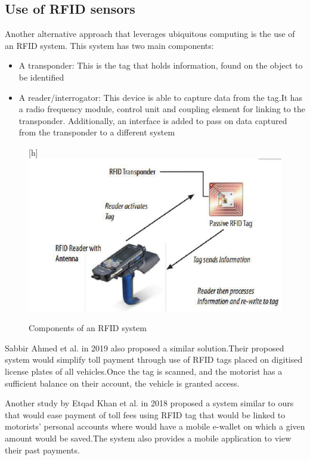 \subsection{Use of RFID sensors}
Another alternative approach that leverages ubiquitous computing is the use of an RFID system. This system has two main components:
\begin{itemize}
    \item A transponder: This is the tag that holds information, found on the object to be identified
    \item A reader/interrogator: This device is able to capture data from the tag.It has a radio frequency module,  control unit and coupling element for linking to the transponder. Additionally, an interface is added to pass on data captured from the transponder to a different system
\end{itemize}
\begin{figure}
    \begin{center}[h]
        \includegraphics[scale = 0.3]{images/rfid-pic}
        \caption{Components of an RFID system}
    \end{center}
\end{figure}
Sabbir Ahmed et al. in 2019 also proposed a similar solution.Their proposed system would simplify toll payment through use of RFID tags placed on digitised license plates of all vehicles.Once the tag is scanned, and the motorist has a sufficient balance on their account, the vehicle is granted access\cite{ahmed_automated_2019}.


Another study by Etqad Khan et al. in 2018 proposed a system similar to ours that would ease payment of toll fees using RFID tag that would be linked to motorists' personal accounts where would have a mobile e-wallet on which a given amount would be saved.The system also provides a mobile application to view their past payments\cite{khan_automated_2018}.

